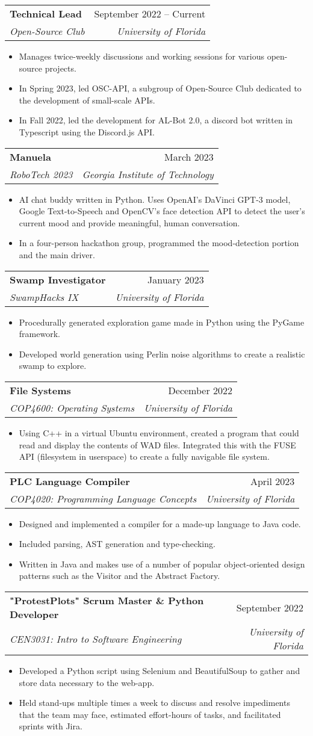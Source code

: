 \documentclass[letterpaper,11pt]{article}
\makeatletter
\newcommand{\resumeItem}[1]{
  \item\small{
    {#1 \vspace{-2pt}}
  }
}
\newcommand{\resumeSubheading}[4]{
  \vspace{-2pt}\item
    \begin{tabular*}{0.97\textwidth}[t]{l@{\extracolsep{\fill}}r}
      \textbf{#1} & #2 \\
      \textit{\small#3} & \textit{\small #4} \\
    \end{tabular*}\vspace{-7pt}
}
\newcommand{\resumeItemListStart}{\begin{itemize}}
\newcommand{\resumeItemListEnd}{\end{itemize}\vspace{-5pt}}
\makeatother
\begin{document}
    \resumeSubheading
      {Technical Lead}{September 2022 -- Current}
      {Open-Source Club}{University of Florida}
      \resumeItemListStart
        \resumeItem{Manages twice-weekly discussions and working sessions for various open-source projects.}
        \resumeItem{In Spring 2023, led OSC-API, a subgroup of Open-Source Club dedicated to the development of small-scale APIs.}
        \resumeItem{In Fall 2022, led the development for AL-Bot 2.0, a discord bot written in Typescript using the Discord.js API.}
      \resumeItemListEnd

    \resumeSubheading
      {Manuela}{March 2023}
      {RoboTech 2023}{Georgia Institute of Technology}
      \resumeItemListStart
        \resumeItem{AI chat buddy written in Python. Uses OpenAI’s DaVinci GPT-3 model, Google Text-to-Speech and OpenCV’s face detection API to detect the user’s current mood and provide meaningful, human conversation.}
        \resumeItem{In a four-person hackathon group, programmed the mood-detection portion and the main driver.}
    \resumeItemListEnd

    \resumeSubheading
      {Swamp Investigator}{January 2023}
      {SwampHacks IX}{University of Florida}
      \resumeItemListStart
        \resumeItem{Procedurally generated exploration game made in Python using the PyGame framework.}
        \resumeItem{Developed world generation using Perlin noise algorithms to create a realistic swamp to explore.}
      \resumeItemListEnd

    \resumeSubheading
      {File Systems}{December 2022}
      {COP4600: Operating Systems}{University of Florida}
      \resumeItemListStart
        \resumeItem{Using C++ in a virtual Ubuntu environment, created a program that could read and display the contents of WAD files. Integrated this with the FUSE API (filesystem in userspace) to create a fully navigable file system.}
      \resumeItemListEnd

    \resumeSubheading
      {PLC Language Compiler}{April 2023}
      {COP4020: Programming Language Concepts}{University of Florida}
      \resumeItemListStart
        \resumeItem{Designed and implemented a compiler for a made-up language to Java code.}
        \resumeItem{Included parsing, AST generation and type-checking.}
        \resumeItem{Written in Java and makes use of a number of popular object-oriented design patterns such as the Visitor and the Abstract Factory.}
      \resumeItemListEnd

    \resumeSubheading
      {"ProtestPlots" Scrum Master \& Python Developer}{September 2022}
      {CEN3031: Intro to Software Engineering}{University of Florida}
      \resumeItemListStart
        \resumeItem{Developed a Python script using Selenium and BeautifulSoup to gather and store data necessary to the web-app.}
        \resumeItem{Held stand-ups multiple times a week to discuss and resolve impediments that the team may face, estimated effort-hours of tasks, and facilitated sprints with Jira.}
      \resumeItemListEnd
\end{document}

